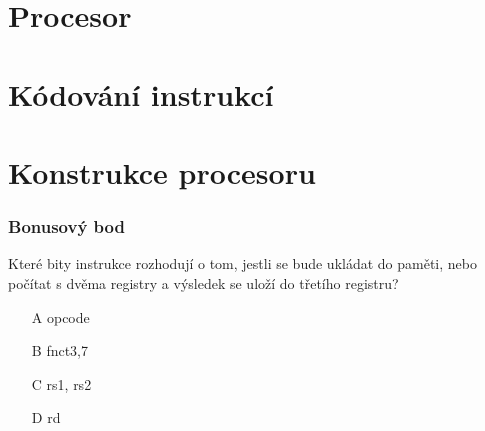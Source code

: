 \documentclass{beamer}
\subtitle{Lekce 03. Central Processing Unit (CPU)}
\author{Pavel Píša \phantom{xxxxxxx} Petr Štěpán \\ \small\texttt{pisa@fel.cvut.cz}\phantom{xxxx}\small\texttt{stepan@fel.cvut.cz}}
\begin{document}
\maketitle

\section{Procesor}







\section{Kódování instrukcí}







\section{Konstrukce procesoru}












\begin{frame}
\frametitle{Bonusový bod}

Které bity instrukce rozhodují o tom, jestli se bude ukládat do paměti, nebo počítat s dvěma registry a výsledek se uloží do třetího registru?
\begin{itemize}
\item[A] opcode
\item[B] fnct3,7
\item[C] rs1, rs2
\item[D] rd
\end{itemize}
\end{frame}
\end{document}
